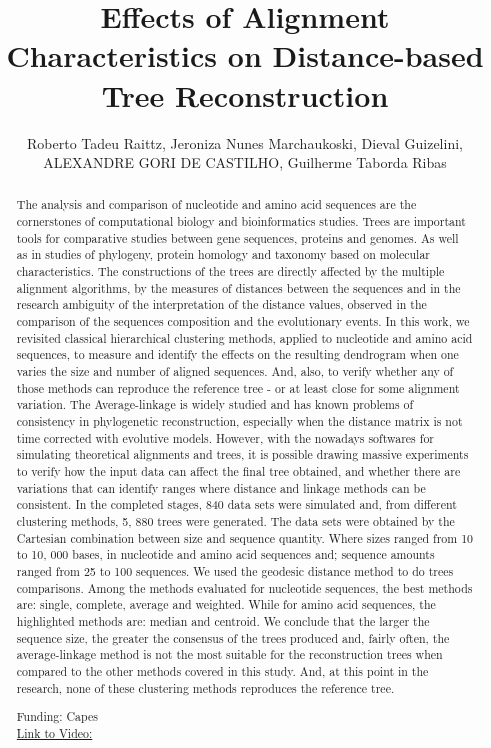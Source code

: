 \documentclass[twoside]{article}
\title{\vspace{-15mm}\fontsize{24pt}{10pt}\selectfont\textbf{ Effects of Alignment Characteristics on Distance-based Tree Reconstruction }} %
\author{ Roberto Tadeu Raittz,  Jeroniza Nunes  Marchaukoski,  Dieval Guizelini,  ALEXANDRE GORI DE CASTILHO,  Guilherme Taborda Ribas }
\affil{ UNIVERSIDADE FEDERAL DO PARAN\'A }
\date{}
\begin{document}
  
  
  \maketitle %
  
  
  \thispagestyle{fancy} %
  
  
  \begin{abstract}
  The analysis and comparison of nucleotide and amino acid sequences are the cornerstones of computational biology and bioinformatics studies. Trees are important tools for comparative studies between gene sequences,  proteins and genomes. As well as in studies of phylogeny,  protein homology and taxonomy based on molecular characteristics. The constructions of the trees are directly affected by the multiple alignment algorithms,  by the measures of distances between the sequences and in the research ambiguity of the interpretation of the distance values,  observed in the comparison of the sequences composition and the evolutionary events. In this work,  we revisited classical hierarchical clustering methods,  applied to nucleotide and amino acid sequences,  to measure and identify the effects on the resulting dendrogram when one varies the size and number of aligned sequences. And,  also,  to verify whether any of those methods can reproduce the reference tree - or at least close for some alignment variation. The Average-linkage is widely studied and has known problems of consistency in phylogenetic reconstruction,  especially when the distance matrix is not time corrected with evolutive models. However,  with the nowadays softwares for simulating theoretical alignments and trees,  it is  possible drawing massive experiments to verify how the input data can affect the final tree obtained,  and whether there are variations that can identify ranges where distance and linkage methods can be consistent. In the completed stages,  840 data sets were simulated and,  from different clustering methods,  5, 880 trees were generated. The data sets were obtained by the Cartesian combination between size and sequence quantity. Where sizes ranged from 10 to 10, 000 bases,  in nucleotide and amino acid sequences and; sequence amounts ranged from 25 to 100 sequences. We used the geodesic distance method to do trees comparisons. Among the methods evaluated for nucleotide sequences,  the best methods are: single,  complete,  average and weighted. While for amino acid sequences,  the highlighted methods are: median and centroid. We conclude that the larger the sequence size,  the greater the consensus of the trees produced and,  fairly often,  the average-linkage method is not the most suitable for the reconstruction trees when compared to the other methods covered in this study. And,  at this point in the research,  none of these clustering methods reproduces the reference tree.
  
  Funding: Capes \\
  \href{http://ab3c.org.br/xpress_pres2020/xmxp2020-303178.html}{Link to Video:}

  \end{abstract}
   
  
\end{document}
